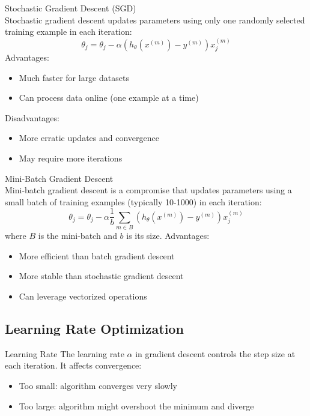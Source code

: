 \begin{definition}{Stochastic Gradient Descent (SGD)}\\
Stochastic gradient descent updates parameters using only one randomly selected training example in each iteration:
\[\theta_j = \theta_j - \alpha (h_\theta(x^{(m)}) - y^{(m)})x^{(m)}_j\]
Advantages:
\begin{itemize}
    \item Much faster for large datasets
    \item Can process data online (one example at a time)
\end{itemize}
Disadvantages:
\begin{itemize}
    \item More erratic updates and convergence
    \item May require more iterations
\end{itemize}
\end{definition}

\begin{definition}{Mini-Batch Gradient Descent}\\
Mini-batch gradient descent is a compromise that updates parameters using a small batch of training examples (typically 10-1000) in each iteration:
\[\theta_j = \theta_j - \alpha \frac{1}{b}\sum_{m \in B}(h_\theta(x^{(m)}) - y^{(m)})x^{(m)}_j\]
where $B$ is the mini-batch and $b$ is its size.
Advantages:
\begin{itemize}
    \item More efficient than batch gradient descent
    \item More stable than stochastic gradient descent
    \item Can leverage vectorized operations
\end{itemize}
\end{definition}

\raggedcolumns
\columnbreak

\subsection{Learning Rate Optimization}

\begin{definition}{Learning Rate}
The learning rate $\alpha$ in gradient descent controls the step size at each iteration. It affects convergence:
\begin{itemize}
    \item Too small: algorithm converges very slowly
    \item Too large: algorithm might overshoot the minimum and diverge
\end{itemize}
\end{definition}

